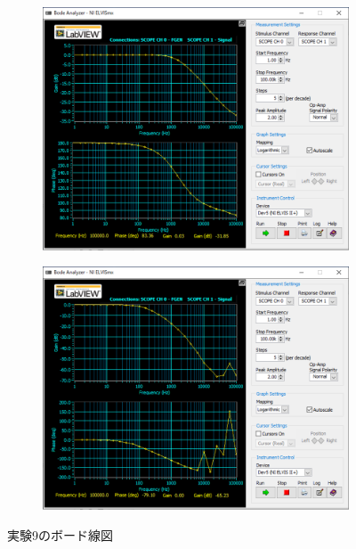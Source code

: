 \begin{figure}
	\centering
	\begin{subfigure}{0.8\textwidth}
		\centering
		\includegraphics[width=0.8\linewidth]{src/figures/exp9/ope2-bode.png}
		\label{subfig:exp9-ope2-bode}
	\end{subfigure}
	\begin{subfigure}{0.8\textwidth}
		\centering
		\includegraphics[width=0.8\linewidth]{src/figures/exp9/ope12-bode.png}
		\label{subfig:exp9-ope2-ope1-bode}
	\end{subfigure}
	\caption{実験9のボード線図}\label{fig:exp9-bode}
\end{figure}
